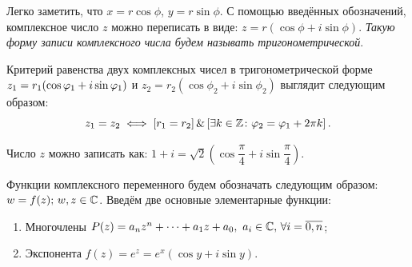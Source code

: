 \begin{definition}
Легко заметить, что \(x = r\cos{\phi}\), \(y = r\sin{\phi}\). С помощью введённых обозначений,
комплексное число \(z\) можно переписать в виде: \(z = r(\cos{\phi} + i\sin{\phi})\). \textit{Такую
форму записи комплексного числа будем называть тригонометрической}.

Критерий равенства двух комплексных чисел в тригонометрической форме \(z_1 \hm= r_1(\cos{\phi_1} +
i\sin{\phi_1})\) и \(z_2 = r_2(\cos{\phi_2} + i\sin{\phi_2})\) выглядит следующим образом:
\[
    z_1 = z_2 \iff \left[r_1 = r_2\right] \& \left[\exists k \in \mathbb{Z} \colon \varphi_2 = \varphi_1 + 2\pi
        k\right].
\]
\end{definition}

\begin{example}
\par\noindent

\begin{minipage}[c]{0.3\textwidth}
  \centering
\end{minipage}%
\hfill
\begin{minipage}[c]{0.65\textwidth}
Число \(z\) можно записать как: \(1 + i = \sqrt{2}\left(\cos{\dfrac{\pi}{4}} + i\sin{\dfrac{\pi}{4}}\right)\).
\end{minipage}
\end{example}


Функции комплексного переменного будем обозначать следующим образом: \(w \hm= f(z); \, w, z\in\Co\).
Введём две основные элементарные функции:
\begin{enumerate}
\item Многочлены \(P(z) = a_n z^n + \dots + a_1 z + a_0, \ a_i \in \mathbb{C}, \, \forall i =
    \overline{0,n}\);
\item Экспонента \(f(z) = e^z = e^x(\cos{y} + i\sin{y})\).
\end{enumerate}

